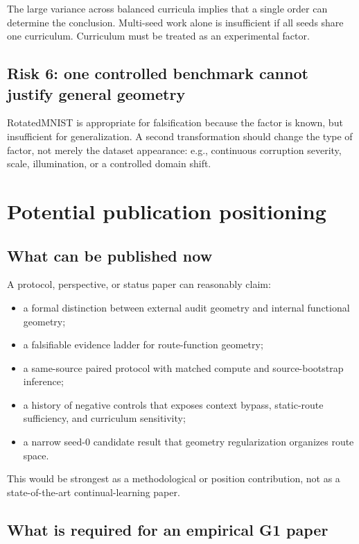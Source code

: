 \documentclass[11pt,a4paper]{article}
\begin{document}
The large variance across balanced curricula implies that a single order can determine the conclusion. Multi-seed work alone is insufficient if all seeds share one curriculum. Curriculum must be treated as an experimental factor.

\subsection{Risk 6: one controlled benchmark cannot justify general geometry}

RotatedMNIST is appropriate for falsification because the factor is known, but insufficient for generalization. A second transformation should change the type of factor, not merely the dataset appearance: e.g., continuous corruption severity, scale, illumination, or a controlled domain shift.

\section{Potential publication positioning}

\subsection{What can be published now}

A protocol, perspective, or status paper can reasonably claim:

\begin{itemize}
\item a formal distinction between external audit geometry and internal functional geometry;
\item a falsifiable evidence ladder for route-function geometry;
\item a same-source paired protocol with matched compute and source-bootstrap inference;
\item a history of negative controls that exposes context bypass, static-route sufficiency, and curriculum sensitivity;
\item a narrow seed-0 candidate result that geometry regularization organizes route space.
\end{itemize}

This would be strongest as a methodological or position contribution, not as a state-of-the-art continual-learning paper.

\subsection{What is required for an empirical G1 paper}
\end{document}
